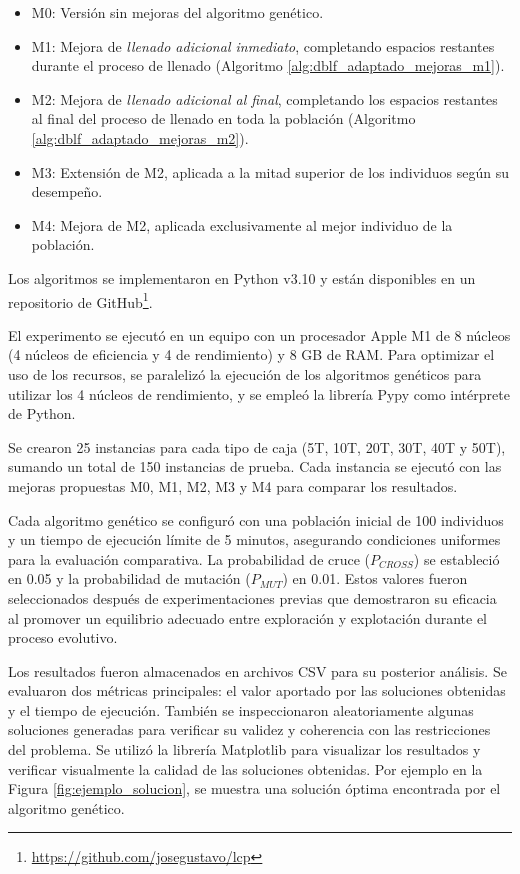 \documentclass[openany]{article}
\begin{document}
\begin{itemize}
    \item M0: Versión sin mejoras del algoritmo genético.
    \item M1: Mejora de \textit{llenado adicional inmediato}, completando espacios restantes durante el proceso de llenado (Algoritmo \ref{alg:dblf_adaptado_mejoras_m1}).
    \item M2: Mejora de \textit{llenado adicional al final}, completando los espacios restantes al final del proceso de llenado en toda la población (Algoritmo \ref{alg:dblf_adaptado_mejoras_m2}).
    \item M3: Extensión de M2, aplicada a la mitad superior de los individuos según su desempeño.
    \item M4: Mejora de M2, aplicada exclusivamente al mejor individuo de la población.
\end{itemize}

Los algoritmos se implementaron en Python v3.10 y están disponibles en un repositorio de GitHub\footnote{\url{https://github.com/josegustavo/lcp}}.

El experimento se ejecutó en un equipo con un procesador Apple M1 de 8 núcleos (4 núcleos de eficiencia y 4 de rendimiento) y 8 GB de RAM. Para optimizar el uso de los recursos, se paralelizó la ejecución de los algoritmos genéticos para utilizar los 4 núcleos de rendimiento, y se empleó la librería Pypy como intérprete de Python.

Se crearon 25 instancias para cada tipo de caja (5T, 10T, 20T, 30T, 40T y 50T), sumando un total de 150 instancias de prueba. Cada instancia se ejecutó con las mejoras propuestas M0, M1, M2, M3 y M4 para comparar los resultados.

Cada algoritmo genético se configuró con una población inicial de 100 individuos y un tiempo de ejecución límite de 5 minutos, asegurando condiciones uniformes para la evaluación comparativa. La probabilidad de cruce ($P_{CROSS}$) se estableció en 0.05 y la probabilidad de mutación ($P_{MUT}$) en 0.01. Estos valores fueron seleccionados después de experimentaciones previas que demostraron su eficacia al promover un equilibrio adecuado entre exploración y explotación durante el proceso evolutivo.

Los resultados fueron almacenados en archivos CSV para su posterior análisis. Se evaluaron dos métricas principales: el valor aportado por las soluciones obtenidas y el tiempo de ejecución. También se inspeccionaron aleatoriamente algunas soluciones generadas para verificar su validez y coherencia con las restricciones del problema. Se utilizó la librería Matplotlib para visualizar los resultados y verificar visualmente la calidad de las soluciones obtenidas. Por ejemplo en la Figura \ref{fig:ejemplo_solucion}, se muestra una solución óptima encontrada por el algoritmo genético.
\end{document}
